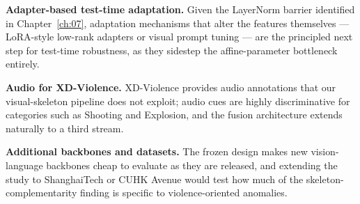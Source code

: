 \textbf{Adapter-based test-time adaptation.} Given the LayerNorm barrier
identified in Chapter~\ref{ch:07}, adaptation mechanisms that alter the
features themselves --- LoRA-style low-rank adapters or visual prompt tuning
--- are the principled next step for test-time robustness, as they sidestep
the affine-parameter bottleneck entirely.

\textbf{Audio for XD-Violence.} XD-Violence provides audio annotations that
our visual-skeleton pipeline does not exploit; audio cues are highly
discriminative for categories such as Shooting and Explosion, and the fusion
architecture extends naturally to a third stream.

\textbf{Additional backbones and datasets.} The frozen design makes new
vision-language backbones cheap to evaluate as they are released, and
extending the study to ShanghaiTech or CUHK Avenue would test how much of the
skeleton-complementarity finding is specific to violence-oriented anomalies.
